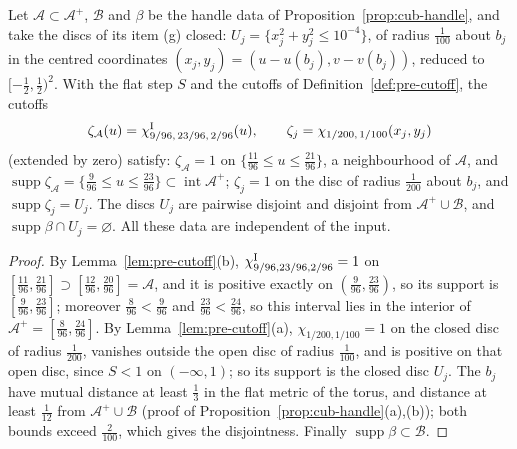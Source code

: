 \begin{proposition}\label{prop:fer-handle}
Let $\mathcal A\subset\mathcal A^+$, $\mathcal B$ and $\beta$ be the handle data of Proposition~\ref{prop:cub-handle}, and take
the discs of its item (g) closed: $U_j=\{x_j^2+y_j^2\le10^{-4}\}$, of radius $\frac1{100}$ about $b_j$ in the centred coordinates
$(x_j,y_j)=(u-u(b_j),v-v(b_j))$, reduced to $[-\frac12,\frac12)^2$. With the flat step $S$ and the cutoffs of
Definition~\ref{def:pre-cutoff}, the cutoffs
\[
 \zeta_{\mathcal A}(u)=\chi^{\rm I}_{9/96,\,23/96,\,2/96}(u),\qquad \zeta_j=\chi_{1/200,\,1/100}(x_j,y_j)
\]
(extended by zero) satisfy: $\zeta_{\mathcal A}=1$ on $\{\frac{11}{96}\le u\le\frac{21}{96}\}$, a neighbourhood of $\mathcal A$, and
$\operatorname{supp}\zeta_{\mathcal A}=\{\frac9{96}\le u\le\frac{23}{96}\}\subset\operatorname{int}\mathcal A^+$; $\zeta_j=1$ on the disc
of radius $\frac1{200}$ about $b_j$, and $\operatorname{supp}\zeta_j=U_j$. The discs $U_j$ are pairwise disjoint and disjoint from
$\mathcal A^+\cup\mathcal B$, and $\operatorname{supp}\beta\cap U_j=\varnothing$. All these data are independent of the input.
\end{proposition}

\begin{proof}
By Lemma~\ref{lem:pre-cutoff}(b), $\chi^{\rm I}_{9/96,23/96,2/96}=1$ on $[\frac{11}{96},\frac{21}{96}]\supset
[\frac{12}{96},\frac{20}{96}]=\mathcal A$, and it is positive exactly on $(\frac9{96},\frac{23}{96})$, so its support is
$[\frac9{96},\frac{23}{96}]$; moreover $\frac8{96}<\frac9{96}$ and $\frac{23}{96}<\frac{24}{96}$, so this interval lies in the interior
of $\mathcal A^+=[\frac8{96},\frac{24}{96}]$. By Lemma~\ref{lem:pre-cutoff}(a), $\chi_{1/200,1/100}=1$ on the closed disc of radius
$\frac1{200}$, vanishes outside the open disc of radius $\frac1{100}$, and is positive on that open disc, since $S<1$ on $(-\infty,1)$;
so its support is the closed disc $U_j$. The $b_j$ have mutual distance at least $\frac13$ in the flat metric of the torus,
and distance at least $\frac1{12}$ from $\mathcal A^+\cup\mathcal B$ (proof of Proposition~\ref{prop:cub-handle}(a),(b)); both
bounds exceed $\frac2{100}$, which gives the disjointness. Finally $\operatorname{supp}\beta\subset\mathcal B$.
\end{proof}

